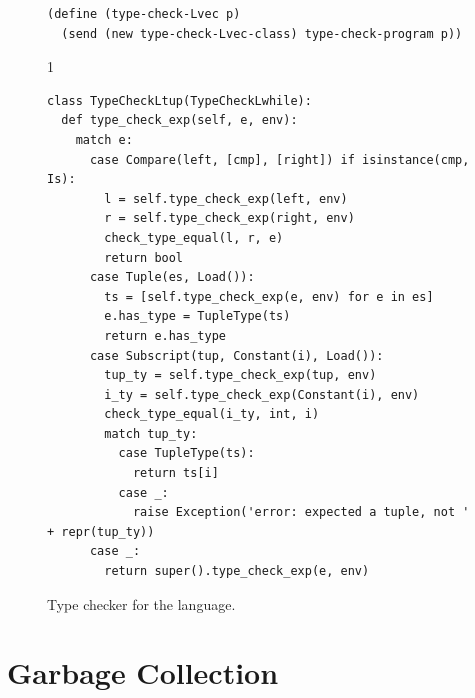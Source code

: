 \documentclass[7x10]{TimesAPriori_MIT}%
\def\pythonEd{1}
\def\edition{1}
\newcommand{\pythonColor}[0]{}
\numberwithin{theorem}{chapter}
\numberwithin{definition}{chapter}
\numberwithin{equation}{chapter}
\begin{document}
\begin{figure}[tp]
\begin{tcolorbox}[colback=white]
{\begin{lstlisting}[basicstyle=\ttfamily\footnotesize]
(define (type-check-Lvec p)
  (send (new type-check-Lvec-class) type-check-program p))
\end{lstlisting}
\fi}
{\if\edition\pythonEd\pythonColor
\begin{lstlisting}
class TypeCheckLtup(TypeCheckLwhile):
  def type_check_exp(self, e, env):
    match e:
      case Compare(left, [cmp], [right]) if isinstance(cmp, Is):
        l = self.type_check_exp(left, env)
        r = self.type_check_exp(right, env)
        check_type_equal(l, r, e)
        return bool
      case Tuple(es, Load()):
        ts = [self.type_check_exp(e, env) for e in es]
        e.has_type = TupleType(ts)
        return e.has_type
      case Subscript(tup, Constant(i), Load()):
        tup_ty = self.type_check_exp(tup, env)
        i_ty = self.type_check_exp(Constant(i), env)
        check_type_equal(i_ty, int, i)
        match tup_ty:
          case TupleType(ts):
            return ts[i]
          case _:
            raise Exception('error: expected a tuple, not ' + repr(tup_ty))
      case _:
        return super().type_check_exp(e, env)
\end{lstlisting}
\fi}
  \end{tcolorbox}

  \caption{Type checker for the \LangVec{} language.}
\label{fig:type-check-Lvec}
\end{figure}


\section{Garbage Collection}
\label{sec:GC}
\end{document}
